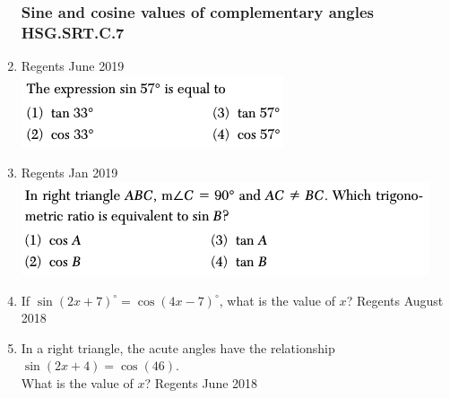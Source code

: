 \documentclass[12pt, twoside]{article}
\begin{document}
\begin{enumerate}
\subsubsection*{Sine and cosine values of complementary angles \hfill HSG.SRT.C.7}
\item Regents June 2019\\
 \includegraphics[scale=0.65]{sine-cos-9_Jun2019.png}

\item Regents Jan 2019 \\
\includegraphics[scale=0.65]{sine-cos-9_Jan2019.png}

\item If $\sin(2x+7)^\circ = \cos(4x-7)^\circ$, what is the value of $x$? \hfill Regents August 2018
\vspace{1cm}

\item In a right triangle, the acute angles have the relationship $\sin(2x + 4) =\cos (46)$. \\[0.25cm]
What is the value of $x$? \hfill Regents June 2018

\end{enumerate}
\end{document}
